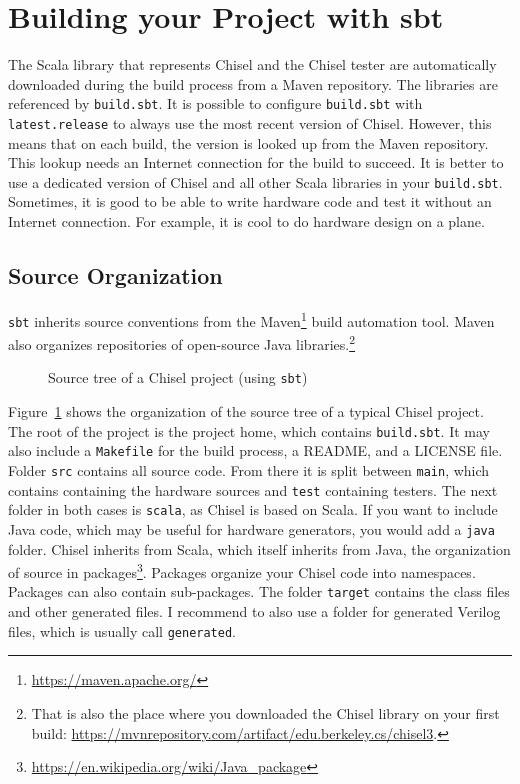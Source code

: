 \documentclass[%
    10pt,
    headinclude, footexclude,
    openright, %
    notitlepage,
    cleardoubleempty,
    headsepline,
    pointlessnumbers,
    bibtotoc, idxtotoc,
    ]{scrbook}
\newcommand{\code}[1]{{\small{\texttt{#1}}}}
\newcommand{\myref}[2]{\href{#1}{#2}}
\renewcommand{\myref}[2]{{#2}{\footnote{\url{#1}}}}
\begin{document}
\section{Building your Project with sbt}


The Scala library that represents Chisel and the Chisel tester are automatically
downloaded during the build process from a Maven repository.
The libraries are referenced by \code{build.sbt}. It is possible to configure \code{build.sbt}
with \code{latest.release} to always use the most recent version of Chisel.
However, this means that on each build, the version is looked up from the Maven
repository. This lookup needs an Internet connection for the build to succeed.
It is better to use a dedicated version of Chisel and all other Scala libraries in your \code{build.sbt}.
Sometimes, it is good to be able to write hardware code and test it without an Internet connection.
For example, it is cool to do hardware design on a plane.

\subsection{Source Organization}


\code{sbt} inherits source conventions from the \myref{https://maven.apache.org/}{Maven}
build automation tool. Maven also organizes repositories of open-source Java libraries.\footnote{That is
also the place where you downloaded the Chisel library on your first build:
\url{https://mvnrepository.com/artifact/edu.berkeley.cs/chisel3}.}

\begin{figure}
\caption{Source tree of a Chisel project (using \code{sbt})}
\label{fig:folders}
\end{figure}

Figure~\ref{fig:folders} shows the organization of the source tree of a typical Chisel project.
The root of the project is the project home, which contains \code{build.sbt}.
It may also include a \code{Makefile} for the build process, a README, and a LICENSE file.
Folder \code{src} contains all source code. From there it is split between \code{main},
which contains containing the hardware sources and \code{test} containing testers.
The next folder in both cases is \code{scala}, as Chisel is based on Scala.
If you want to include Java code, which may be useful for hardware generators,
you would add a \code{java} folder.
Chisel inherits from Scala, which itself inherits from Java, the organization of source
in \myref{https://en.wikipedia.org/wiki/Java_package}{packages}.
Packages organize your Chisel code into namespaces. Packages can also contain
sub-packages.
The folder \code{target} contains the class files and other generated files.
I recommend to also use a folder for generated Verilog files, which is usually
call \code{generated}.
\end{document}
